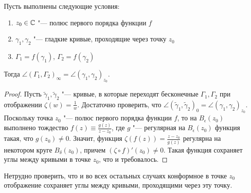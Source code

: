 \begin{example}
\begin{center}
	\end{center}
\end{example}

\begin{proposition}
	Пусть выполнены следующие условия:
	\begin{enumerate}
		\item $z_0 \in \mathbb{C}$ "--- полюс первого порядка функции $f$
		\item $\gamma_1, \gamma_2$ "--- гладкие кривые, проходящие через точку $z_0$
		\item $\Gamma_1 = f(\gamma_1)$, $\Gamma_2 = f(\gamma_2)$
	\end{enumerate}
	
	Тогда $\angle(\Gamma_1, \Gamma_2)_\infty = \angle(\gamma_1, \gamma_2)_{z_0}$.
\end{proposition}

\begin{proof}
	Пусть $\widetilde\gamma_1, \widetilde\gamma_2$ "--- кривые, в которые переходят бесконечные $\Gamma_1, \Gamma_2$ при отображении $\zeta(w) = \frac 1w$. Достаточно проверить, что $\angle(\widetilde\gamma_1, \widetilde\gamma_2)_0 = \angle(\gamma_1, \gamma_2)_{z_0}$. Поскольку точка $z_0$ "--- полюс первого порядка функции $f$, то на $B_\epsilon(z_0)$ выполнено тождество $f(z) \equiv \frac{g(z)}{z - z_0}$, где $g$ "--- регулярная на $B_\epsilon(z_0)$ функция такая, что $g(z_0) \ne 0$. Значит, функция $\zeta(f(z)) = \frac{z - z_0}{g(z)}$ регулярна на некотором круге $B_\delta(z_0)$, причем $(\zeta \circ f)'(z_0) \ne 0$. Такая функция сохраняет углы между кривыми в точке $z_0$, что и требовалось.
\end{proof}

\begin{note}
	Нетрудно проверить, что и во всех остальных случаях конформное в точке $z_0$ отображение сохраняет углы между кривыми, проходящими через эту точку.
\end{note}

